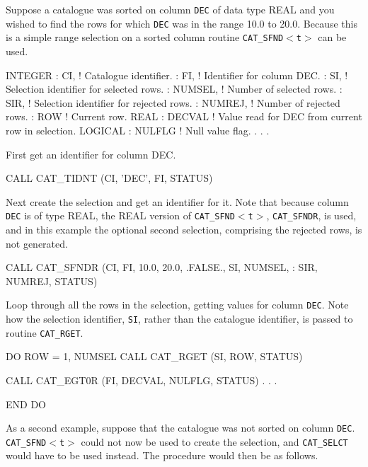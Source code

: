 \documentclass[11pt,twoside]{starlink}
\begin{document}
Suppose a catalogue was sorted on column \texttt{DEC} of data type REAL
and you wished to find the rows for which \texttt{DEC} was in the range
10.0 to 20.0. Because this is a simple range selection on a sorted
column routine \texttt{CAT\_SFND$<$t$>$} can be used.

\begin{terminalv}
      INTEGER
     :  CI,      ! Catalogue identifier.
     :  FI,      ! Identifier for column DEC.
     :  SI,      ! Selection identifier for selected rows.
     :  NUMSEL,  ! Number of selected rows.
     :  SIR,     ! Selection identifier for rejected rows.
     :  NUMREJ,  ! Number of rejected rows.
     :  ROW      ! Current row.
      REAL
     :  DECVAL   ! Value read for DEC from current row in selection.
      LOGICAL
     :  NULFLG   ! Null value flag.
       .
       .
       .
\end{terminalv}

First get an identifier for column DEC.

\begin{terminalv}
      CALL CAT_TIDNT (CI, 'DEC', FI, STATUS)
\end{terminalv}

Next create the selection and get an identifier for it. Note that
because column \texttt{DEC} is of type REAL, the REAL version of \texttt{CAT\_SFND$<$t$>$}, \texttt{CAT\_SFNDR}, is used, and in this example the
optional second selection, comprising the rejected rows, is not
generated.

\begin{terminalv}
      CALL CAT_SFNDR (CI, FI, 10.0, 20.0, .FALSE., SI, NUMSEL,
     :  SIR, NUMREJ, STATUS)
\end{terminalv}

Loop through all the rows in the selection, getting values for
column \texttt{DEC}.  Note how the selection identifier, \texttt{SI}, rather
than the catalogue identifier, is passed to routine \texttt{CAT\_RGET}.


\begin{terminalv}
      DO ROW = 1, NUMSEL
         CALL CAT_RGET (SI, ROW, STATUS)

         CALL CAT_EGT0R (FI, DECVAL, NULFLG, STATUS)
           .
           .
           .

      END DO
\end{terminalv}

As a second example, suppose that the catalogue was not sorted on column
\texttt{DEC}. \texttt{CAT\_SFND$<$t$>$} could not now be used to create the
selection, and \texttt{CAT\_SELCT} would have to be used instead. The
procedure would then be as follows.
\end{document}
